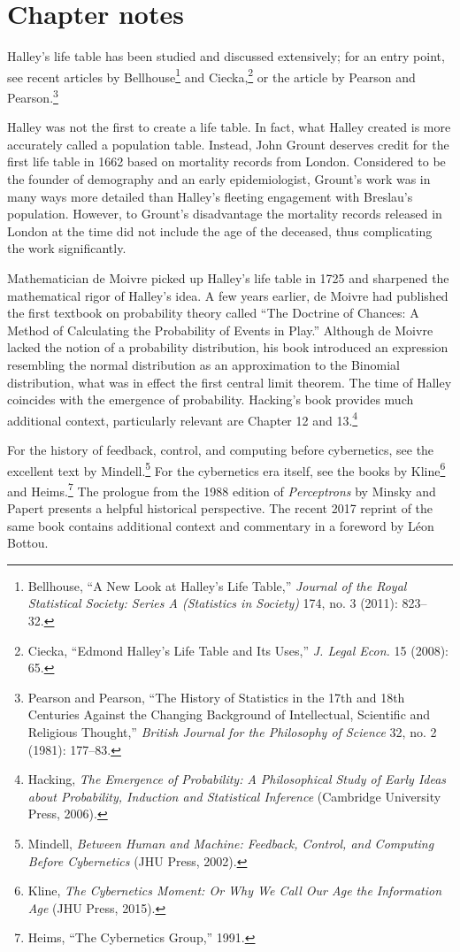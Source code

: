\documentclass{tufte-book}
\begin{document}
\hypertarget{chapter-notes}{%
\section{Chapter notes}\label{chapter-notes}}

Halley's life table has been studied and discussed extensively; for an
entry point, see recent articles by Bellhouse\footnote{Bellhouse, {``A
  New Look at Halley's Life Table,''} \emph{Journal of the Royal
  Statistical Society: Series A (Statistics in Society)} 174, no. 3
  (2011): 823--32.} and Ciecka,\footnote{Ciecka, {``Edmond Halley's Life
  Table and Its Uses,''} \emph{J. Legal Econ.} 15 (2008): 65.} or the
article by Pearson and Pearson.\footnote{Pearson and Pearson, {``The
  History of Statistics in the 17th and 18th Centuries Against the
  Changing Background of Intellectual, Scientific and Religious
  Thought,''} \emph{British Journal for the Philosophy of Science} 32,
  no. 2 (1981): 177--83.}

Halley was not the first to create a life table. In fact, what Halley
created is more accurately called a population table. Instead, John
Grount deserves credit for the first life table in 1662 based on
mortality records from London. Considered to be the founder of
demography and an early epidemiologist, Grount's work was in many ways
more detailed than Halley's fleeting engagement with Breslau's
population. However, to Grount's disadvantage the mortality records
released in London at the time did not include the age of the deceased,
thus complicating the work significantly.

Mathematician de Moivre picked up Halley's life table in 1725 and
sharpened the mathematical rigor of Halley's idea. A few years earlier,
de Moivre had published the first textbook on probability theory called
``The Doctrine of Chances: A Method of Calculating the Probability of
Events in Play.'' Although de Moivre lacked the notion of a probability
distribution, his book introduced an expression resembling the normal
distribution as an approximation to the Binomial distribution, what was
in effect the first central limit theorem. The time of Halley coincides
with the emergence of probability. Hacking's book provides much
additional context, particularly relevant are Chapter 12 and
13.\footnote{Hacking, \emph{The Emergence of Probability: A
  Philosophical Study of Early Ideas about Probability, Induction and
  Statistical Inference} (Cambridge University Press, 2006).}

For the history of feedback, control, and computing before cybernetics,
see the excellent text by Mindell.\footnote{Mindell, \emph{Between Human
  and Machine: Feedback, Control, and Computing Before Cybernetics} (JHU
  Press, 2002).} For the cybernetics era itself, see the books by
Kline\footnote{Kline, \emph{The Cybernetics Moment: Or Why We Call Our
  Age the Information Age} (JHU Press, 2015).} and Heims.\footnote{Heims,
  {``The Cybernetics Group,''} 1991.} The prologue from the 1988 edition
of \emph{Perceptrons} by Minsky and Papert presents a helpful historical
perspective. The recent 2017 reprint of the same book contains
additional context and commentary in a foreword by Léon Bottou.
\end{document}
